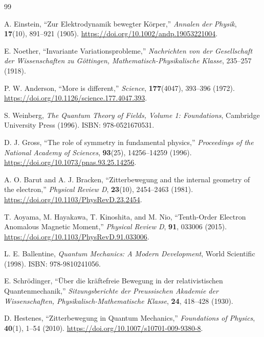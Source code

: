 \documentclass[%
 reprint,
 amsmath,amssymb,
 aps,
]{revtex4-1}
\numberwithin{equation}{section}%
\begin{document}
\begin{thebibliography}{99}


A. Einstein, ``Zur Elektrodynamik bewegter Körper,'' \textit{Annalen der Physik}, \textbf{17}(10), 891--921 (1905). \href{https://doi.org/10.1002/andp.19053221004}{https://doi.org/10.1002/andp.19053221004}.

E. Noether, ``Invariante Variationsprobleme,'' \textit{Nachrichten von der Gesellschaft der Wissenschaften zu Göttingen, Mathematisch-Physikalische Klasse}, 235--257 (1918).

P. W. Anderson, ``More is different,'' \textit{Science}, \textbf{177}(4047), 393--396 (1972). \href{https://doi.org/10.1126/science.177.4047.393}{https://doi.org/10.1126/science.177.4047.393}.

S. Weinberg, \textit{The Quantum Theory of Fields, Volume 1: Foundations}, Cambridge University Press (1996). ISBN: 978-0521670531.

D. J. Gross, ``The role of symmetry in fundamental physics,'' \textit{Proceedings of the National Academy of Sciences}, \textbf{93}(25), 14256--14259 (1996). \href{https://doi.org/10.1073/pnas.93.25.14256}{https://doi.org/10.1073/pnas.93.25.14256}.

A. O. Barut and A. J. Bracken, ``Zitterbewegung and the internal geometry of the electron,'' \textit{Physical Review D}, \textbf{23}(10), 2454--2463 (1981). \href{https://doi.org/10.1103/PhysRevD.23.2454}{https://doi.org/10.1103/PhysRevD.23.2454}.

T. Aoyama, M. Hayakawa, T. Kinoshita, and M. Nio, ``Tenth-Order Electron Anomalous Magnetic Moment,'' \textit{Physical Review D}, \textbf{91}, 033006 (2015). \href{https://doi.org/10.1103/PhysRevD.91.033006}{https://doi.org/10.1103/PhysRevD.91.033006}.

L. E. Ballentine, \textit{Quantum Mechanics: A Modern Development}, World Scientific (1998). ISBN: 978-9810241056.

E. Schrödinger, ``Über die kräftefreie Bewegung in der relativistischen Quantenmechanik,'' \textit{Sitzungsberichte der Preussischen Akademie der Wissenschaften, Physikalisch-Mathematische Klasse}, \textbf{24}, 418--428 (1930).

D. Hestenes, ``Zitterbewegung in Quantum Mechanics,'' \textit{Foundations of Physics}, \textbf{40}(1), 1--54 (2010). \href{https://doi.org/10.1007/s10701-009-9380-8}{https://doi.org/10.1007/s10701-009-9380-8}.


\end{thebibliography}
\end{document}
